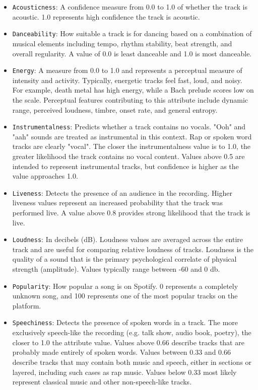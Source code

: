 \documentclass{article}
\renewcommand{\_}[1]{\underline{ #1 }}
\theoremstyle{definition}
\begin{document}
\begin{itemize}
    \item \texttt{Acousticness}: A confidence measure from 0.0 to 1.0 of whether the track is acoustic. 1.0 represents high confidence the track is acoustic.
    \item \texttt{Danceability}: How suitable a track is for dancing based on a combination of musical elements including tempo, rhythm stability, beat strength, and overall regularity. A value of 0.0 is least danceable and 1.0 is most danceable.
    \item \texttt{Energy}: A measure from 0.0 to 1.0 and represents a perceptual measure of intensity and activity. Typically, energetic tracks feel fast, loud, and noisy. For example, death metal has high energy, while a Bach prelude scores low on the scale. Perceptual features contributing to this attribute include dynamic range, perceived loudness, timbre, onset rate, and general entropy.
    \item \texttt{Instrumentalness}: Predicts whether a track contains no vocals. "Ooh" and "aah" sounds are treated as instrumental in this context. Rap or spoken word tracks are clearly "vocal". The closer the instrumentalness value is to 1.0, the greater likelihood the track contains no vocal content. Values above 0.5 are intended to represent instrumental tracks, but confidence is higher as the value approaches 1.0.
    \item \texttt{Liveness}: Detects the presence of an audience in the recording. Higher liveness values represent an increased probability that the track was performed live. A value above 0.8 provides strong likelihood that the track is live.
    \item \texttt{Loudness}: In decibels (dB). Loudness values are averaged across the entire track and are useful for comparing relative loudness of tracks. Loudness is the quality of a sound that is the primary psychological correlate of physical strength (amplitude). Values typically range between -60 and 0 db.
    \item \texttt{Popularity}: How popular a song is on Spotify. 0 represents a completely unknown song, and 100 represents one of the most popular tracks on the platform.
    \item \texttt{Speechiness}: Detects the presence of spoken words in a track. The more exclusively speech-like the recording (e.g. talk show, audio book, poetry), the closer to 1.0 the attribute value. Values above 0.66 describe tracks that are probably made entirely of spoken words. Values between 0.33 and 0.66 describe tracks that may contain both music and speech, either in sections or layered, including such cases as rap music. Values below 0.33 most likely represent classical music and other non-speech-like tracks.

\end{itemize}
\end{document}
